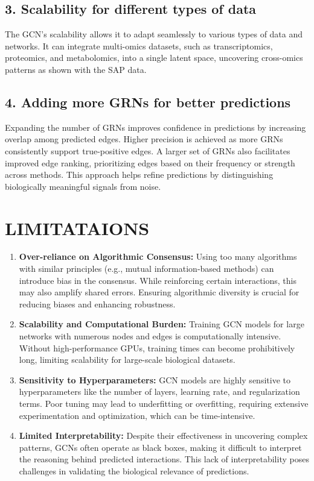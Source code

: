 \documentclass{article}
\begin{document}
\subsection*{3. Scalability for different types of data}
The GCN's scalability allows it to adapt seamlessly to various types of data and networks. It can integrate multi-omics datasets, such as transcriptomics, proteomics, and metabolomics, into a single latent space, uncovering cross-omics patterns as shown with the SAP data. 

\subsection*{4. Adding more GRNs for better predictions}
Expanding the number of GRNs improves confidence in predictions by increasing overlap among predicted edges. Higher precision is achieved as more GRNs consistently support true-positive edges. A larger set of GRNs also facilitates improved edge ranking, prioritizing edges based on their frequency or strength across methods. This approach helps refine predictions by distinguishing biologically meaningful signals from noise. 

\section{LIMITATAIONS}

\begin{enumerate}
    \item \textbf{Over-reliance on Algorithmic Consensus:} Using too many algorithms with similar principles (e.g., mutual information-based methods) can introduce bias in the consensus. While reinforcing certain interactions, this may also amplify shared errors. Ensuring algorithmic diversity is crucial for reducing biases and enhancing robustness.
    
    \item \textbf{Scalability and Computational Burden:} Training GCN models for large networks with numerous nodes and edges is computationally intensive. Without high-performance GPUs, training times can become prohibitively long, limiting scalability for large-scale biological datasets.
    
    \item \textbf{Sensitivity to Hyperparameters:} GCN models are highly sensitive to hyperparameters like the number of layers, learning rate, and regularization terms. Poor tuning may lead to underfitting or overfitting, requiring extensive experimentation and optimization, which can be time-intensive.
    
    \item \textbf{Limited Interpretability:} Despite their effectiveness in uncovering complex patterns, GCNs often operate as black boxes, making it difficult to interpret the reasoning behind predicted interactions. This lack of interpretability poses challenges in validating the biological relevance of predictions.
\end{enumerate}
\end{document}
